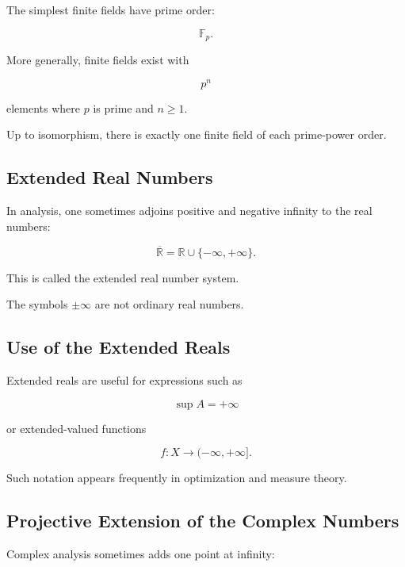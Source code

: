The simplest finite fields have prime order:

\[
\boxed{
\mathbb{F}_p.
}
\]

More generally, finite fields exist with

\[
\boxed{
p^n
}
\]

elements where \(p\) is prime and \(n\geq1\).

Up to isomorphism, there is exactly one finite field of each prime-power
order.

\subsection{Extended Real Numbers}
\label{subsec:extended-real-numbers-reference}

In analysis, one sometimes adjoins positive and negative infinity to the real
numbers:

\[
\boxed{
\overline{\mathbb{R}}
=
\mathbb{R}
\cup
\{-\infty,+\infty\}.
}
\]

This is called the extended real number system.

The symbols \(\pm\infty\) are not ordinary real numbers.

\subsection{Use of the Extended Reals}
\label{subsec:extended-real-use}

Extended reals are useful for expressions such as

\[
\boxed{
\sup A
=
+\infty
}
\]

or extended-valued functions

\[
\boxed{
f:X
\to
(-\infty,+\infty].
}
\]

Such notation appears frequently in optimization and measure theory.

\subsection{Projective Extension of the Complex Numbers}
\label{subsec:riemann-sphere-reference}

Complex analysis sometimes adds one point at infinity:


